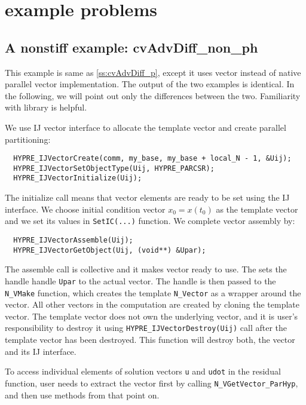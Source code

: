 \section{{\hypre} example problems}\label{s:ex_parhyp}

\subsection{A nonstiff example: cvAdvDiff\_non\_ph}\label{ss:cvAdvDiff_ph}

This example is same as \ref{ss:cvAdvDiff_p}, except it uses {\hypre} 
vector instead of {\sundials} native parallel vector implementation. 
The output of the two examples is identical. In the following, we will point 
out only the differences between the two. Familiarity with {\hypre} library 
\cite{hypre_um} is helpful.  

We use {\hypre} IJ vector interface to allocate the template vector and 
create parallel partitioning: 
\begin{verbatim}
  HYPRE_IJVectorCreate(comm, my_base, my_base + local_N - 1, &Uij);
  HYPRE_IJVectorSetObjectType(Uij, HYPRE_PARCSR);
  HYPRE_IJVectorInitialize(Uij);
\end{verbatim}
The initialize call means that vector elements are ready to be set using 
the IJ interface. We choose initial condition vector $x_0 = x(t_0)$ as the 
template vector and we set its values in \verb|SetIC(...)| function. We 
complete {\hypre} vector assembly by:
\begin{verbatim}
  HYPRE_IJVectorAssemble(Uij);
  HYPRE_IJVectorGetObject(Uij, (void**) &Upar);
\end{verbatim}
The assemble call is collective and it makes {\hypre} vector ready to use. 
The sets the handle handle \verb|Upar| to the actual {\hypre} vector. 
The handle is then passed to the \verb|N_VMake| function, which creates 
the template \verb|N_Vector| as a wrapper around the {\hypre} vector. 
All other vectors in the computation are created by cloning the template 
vector. The template vector does not own the underlying {\hypre} vector, 
and it is user's responsibility to destroy it using 
\verb|HYPRE_IJVectorDestroy(Uij)| call after the template vector has been 
destroyed. This function will destroy both, the {\hypre} vector and its IJ 
interface.

To access individual elements of solution vectors \verb|u| and \verb|udot| 
in the residual function, user needs to extract the {\hypre} vector first 
by calling \verb|N_VGetVector_ParHyp|, and then use {\hypre} methods from 
that point on. 

